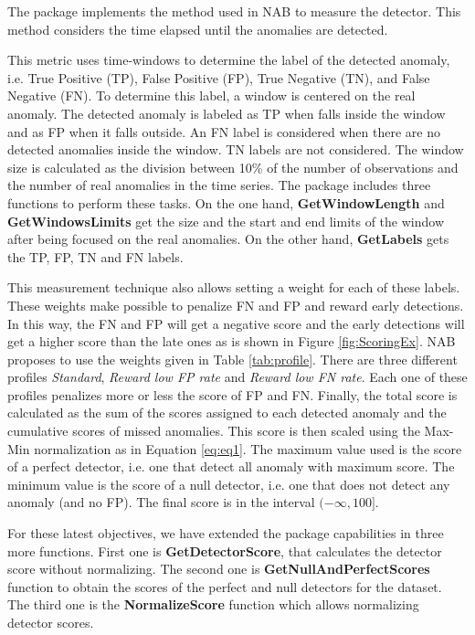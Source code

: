 \documentclass[a4paper]{article}
\begin{document}
The  package implements the method used in NAB \cite{7424283} to measure the detector. This method considers the time elapsed until the anomalies are detected.

This metric uses time-windows to determine the label of the detected anomaly, i.e. True Positive (TP), False Positive (FP), True Negative (TN), and False Negative (FN). To determine this label, a window is centered on the real anomaly. The detected anomaly is labeled as TP when falls inside the window and as FP when it falls outside. An FN label is considered when there are no detected anomalies inside the window. TN labels are not considered. The window size is calculated as the division between 10\% of the number of observations and the number of real anomalies in the time series. The package includes three functions to perform these tasks. On the one hand, \textbf{GetWindowLength} and \textbf{GetWindowsLimits} get the size and the start and end limits of the window after being focused on the real anomalies. On the other hand, \textbf{GetLabels} gets the TP, FP, TN and FN labels.

This measurement technique also allows setting a weight for each of these labels. These weights make possible to penalize FN and FP and reward early detections. In this way, the FN and FP will get a negative score and the early detections will get a higher score than the late ones as is shown in Figure \ref{fig:ScoringEx}. NAB \cite{7424283} proposes to use the weights given in Table \ref{tab:profile}. There are three different profiles \emph{Standard}, \emph{Reward low FP rate} and \emph{Reward low FN rate}. Each one of these profiles penalizes more or less the score of FP and FN. Finally, the total score is calculated as the sum of the scores assigned to each detected anomaly and the cumulative scores of missed anomalies. This score is then scaled using the Max-Min normalization as in Equation \ref{eq:eq1}. The maximum value used is the score of a perfect detector, i.e. one that detect all anomaly with maximum score. The minimum value is the score of a null detector, i.e. one that does not detect any anomaly (and no FP). The final score is in the interval $(-\infty, 100]$.

For these latest objectives, we have extended the package capabilities in three more functions. First one is \textbf{GetDetectorScore}, that calculates the detector score without normalizing. The second one is \textbf{GetNullAndPerfectScores} function to obtain the scores of the perfect and null detectors for the dataset. The third one is the \textbf{NormalizeScore} function which allows normalizing detector scores.
\end{document}
